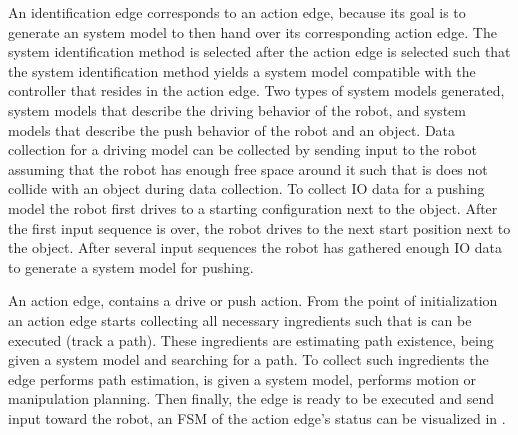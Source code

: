 An identification edge corresponds to an action edge, because its goal is to generate an system model to then hand over its corresponding action edge. The system identification method is selected after the action edge is selected such that the system identification method yields a system model compatible with the controller that resides in the action edge. Two types of system models generated, system models that describe the driving behavior of the robot, and system models that describe the push behavior of the robot and an object. Data collection for a driving model can be collected by sending input to the robot assuming that the robot has enough free space around it such that is does not collide with an object during data collection. To collect \ac{IO} data for a pushing model the robot first drives to a starting configuration next to the object. After the first input sequence is over, the robot drives to the next start position next to the object. After several input sequences the robot has gathered enough \ac{IO} data to generate a system model for pushing.\bs

An action edge, contains a drive or push action. From the point of initialization an action edge starts collecting all necessary ingredients such that is can be executed (track a path). These ingredients are estimating path existence, being given a system model and searching for a path. To collect such ingredients the edge performs path estimation, is given a system model, performs motion or manipulation planning. Then finally, the edge is ready to be executed and send input toward the robot, an \ac{FSM} of the action edge's status can be visualized in .\bs

